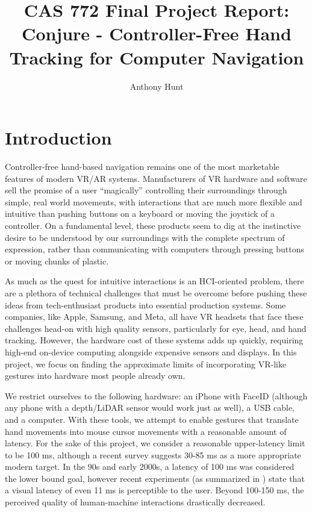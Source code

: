 \documentclass[12pt]{article}
\title{CAS 772 Final Project Report: Conjure - Controller-Free Hand Tracking for Computer Navigation}
\author{Anthony Hunt}
\begin{document}
\maketitle
\newpage

\section{Introduction}


Controller-free hand-based navigation remains one of the most marketable features of modern VR/AR systems. Manufacturers of VR hardware and software sell the promise of a user ``magically'' controlling their surroundings through simple, real world movements, with interactions that are much more flexible and intuitive than pushing buttons on a keyboard or moving the joystick of a controller. On a fundamental level, these products seem to dig at the instinctive desire to be understood by our surroundings with the complete spectrum of expression, rather than communicating with computers through pressing buttons or moving chunks of plastic.

As much as the quest for intuitive interactions is an HCI-oriented problem, there are a plethora of technical challenges that must be overcome before pushing these ideas from tech-enthusiast products into essential production systems. Some companies, like Apple, Samsung, and Meta, all have VR headsets that face these challenges head-on with high quality sensors, particularly for eye, head, and hand tracking. However, the hardware cost of these systems adds up quickly, requiring high-end on-device computing alongside expensive sensors and displays. In this project, we focus on finding the approximate limits of incorporating VR-like gestures into hardware most people already own.

We restrict ourselves to the following hardware: an iPhone with FaceID (although any phone with a depth/LiDAR sensor would work just as well), a USB cable, and a computer. With these tools, we attempt to enable gestures that translate hand movements into mouse cursor movements with a reasonable amount of latency. For the sake of this project, we consider a reasonable upper-latency limit to be 100 ms, although a recent survey \cite{latency} suggests 30-85 ms as a more appropriate modern target. In the 90s and early 2000s, a latency of 100 ms was considered the lower bound goal, however recent experiments (as summarized in \cite{latency}) state that a visual latency of even 11 ms is perceptible to the user. Beyond 100-150 ms, the perceived quality of human-machine interactions drastically decreased.
\end{document}
